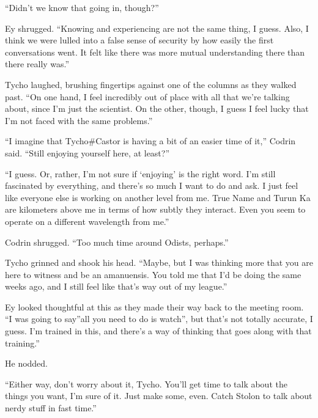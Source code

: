 ``Didn't we know that going in, though?''

Ey shrugged. ``Knowing and experiencing are not the same thing, I guess. Also, I think we were lulled into a false sense of security by how easily the first conversations went. It felt like there was more mutual understanding there than there really was.''

Tycho laughed, brushing fingertips against one of the columns as they walked past. ``On one hand, I feel incredibly out of place with all that we're talking about, since I'm just the scientist. On the other, though, I guess I feel lucky that I'm not faced with the same problems.''

``I imagine that Tycho\#Castor is having a bit of an easier time of it,'' Codrin said. ``Still enjoying yourself here, at least?''

``I guess. Or, rather, I'm not sure if `enjoying' is the right word. I'm still fascinated by everything, and there's so much I want to do and ask. I just feel like everyone else is working on another level from me. True Name and Turun Ka are kilometers above me in terms of how subtly they interact. Even you seem to operate on a different wavelength from me.''

Codrin shrugged. ``Too much time around Odists, perhaps.''

Tycho grinned and shook his head. ``Maybe, but I was thinking more that you are here to witness and be an amanuensis. You told me that I'd be doing the same weeks ago, and I still feel like that's way out of my league.''

Ey looked thoughtful at this as they made their way back to the meeting room. ``I was going to say''all you need to do is watch'', but that's not totally accurate, I guess. I'm trained in this, and there's a way of thinking that goes along with that training.''

He nodded.

``Either way, don't worry about it, Tycho. You'll get time to talk about the things you want, I'm sure of it. Just make some, even. Catch Stolon to talk about nerdy stuff in fast time.''
